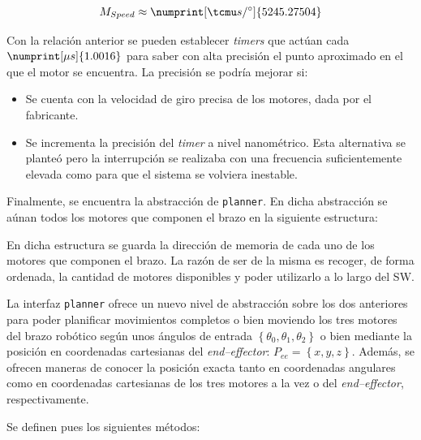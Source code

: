 \begin{equation*}
    M_{Speed} \approx \numprint[\tcmu s / \degree]{5245.27504}
\end{equation*}

Con la relación anterior se pueden establecer \textit{timers} que actúan cada
$\numprint[\mu s]{1.0016}$ para saber con alta precisión el punto aproximado en el
que el motor se encuentra. La precisión se podría mejorar si:

\begin{itemize}
    \item Se cuenta con la velocidad de giro precisa de los motores, dada por el fabricante.
    \item Se incrementa la precisión del \textit{timer} a nivel nanométrico. Esta alternativa
    se planteó pero la interrupción se realizaba con una frecuencia suficientemente elevada
    como para que el sistema se volviera inestable.
\end{itemize}

Finalmente, se encuentra la abstracción de \texttt{planner}. En dicha abstracción se
aúnan todos los motores que componen el brazo en la siguiente estructura:



En dicha estructura se guarda la dirección de memoria de cada uno de los motores
que componen el brazo. La razón de ser de la misma es recoger, de forma ordenada,
la cantidad de motores disponibles y poder utilizarlo a lo largo del \ac{SW}.

La interfaz \texttt{planner} ofrece un nuevo nivel de abstracción sobre los dos
anteriores para poder planificar movimientos completos o bien moviendo los tres
motores del brazo robótico según unos ángulos de entrada 
$\left\{\theta_0, \theta_1, \theta_2\right\}$ o bien mediante la posición en
coordenadas cartesianas del \textit{end--effector}: $P_{ee} = \left\{x, y, z\right\}$.
Además, se ofrecen maneras de conocer la posición exacta tanto en coordenadas angulares
como en coordenadas cartesianas de los tres motores a la vez o del \textit{end--effector},
respectivamente.

Se definen pues los siguientes métodos:



